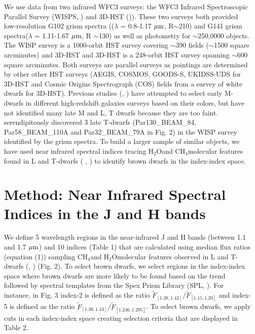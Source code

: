 \documentclass[preprint]{aastex}
\newcommand{\meth}{CH$_4$}
\newcommand{\wat}{H$_2$O}
\begin{document}
We use data from two infrared WFC3 surveys: the WFC3 Infrared Spectroscopic Parallel Survey (WISPS, \citealt{2010ApJ...723..104A} ) and 3D-HST (\citealt{momcheva2015})). These two surveys both provided low-resolution G102 grism spectra (($\lambda$ = 0.8-1.17 $\mbox{$\mu$m}$, R$\sim$210) and G141 grism spectra($\lambda$ = 1.11-1.67  $\mbox{$\mu$m}$, R $\sim$130) as well as photometry for $\sim$250,0000 objects. The WISP survey is a 1000-orbit HST survey covering $\sim$390 fields ($\sim$1500 square arcminutes) and 3D-HST and 3D-HST is a 248-orbit HST survey spanning $\sim$600 square arcminutes. Both surveys are parallel surveys as pointings are determined by other other HST surveys (AEGIS, COSMOS, GOODS-S, UKIDSS-UDS for 3D-HST and  Cosmic Origins Spectrograph (COS) fields from a survey of white dwarfs for 3D-HST). Previous studies (\citealt{stanway16}, \citealt{Vledder2016}) have attempted to select early M-dwarfs in different high-redshift galaxies surveys based on their colors, but have not identified many late M and L, T dwarfs because they are too faint. \citet{2012ApJ...752L..14M} serendipitously discovered 3 late T-dwarfs (Par130\_BEAM\_84, Par58\_BEAM\_110A and Par32\_BEAM\_79A in Fig. 2) in the WISP survey identified by the grism spectra. To build a larger sample of similar objects, we have used near infrared spectral indices tracing \wat  and  \meth  molecular features found in L and T-dwarfs ( \citealt{1999ApJ...519..802K}, \citealt{2000ASPC..212...65B}) to identify brown dwarfs in the index-index space.

\section{Method: Near Infrared Spectral Indices in the J and H bands}

We define 5 wavelength regions in the near-infrared J and H bands (between 1.1 and 1.7 $\mbox{$\mu$m}$) and 10 indices (Table 1) that are calculated using median flux  ratios (equation (1)) sampling \meth and \wat  molecular features observed in L and T-dwarfs (\citealt{1999ApJ...519..802K}, \citealt{2000ASPC..212...65B}) (Fig. 2). To select brown dwarfs, we select regions in the index-index space where brown dwarfs are more likely to be found based on the trend followed by spectral templates from the Spex Prism Library (SPL, \citealt{2014arXiv1406.4887B}). For instance, in Fig. 3 index-2 is defined as the ratio $ \widetilde{F}_{[1.38, 1.43]}/ \widetilde{F}_{[1.15, 1.20] }$ and index-5 is defined as the ratio  $ \widetilde{F}_{[1.38, 1.43] }/ \widetilde{F}_{ [1.246, 1.295]}$. To select brown dwarfs, we apply cuts in each index-index space creating selection criteria that are displayed in Table 2.
\end{document}
